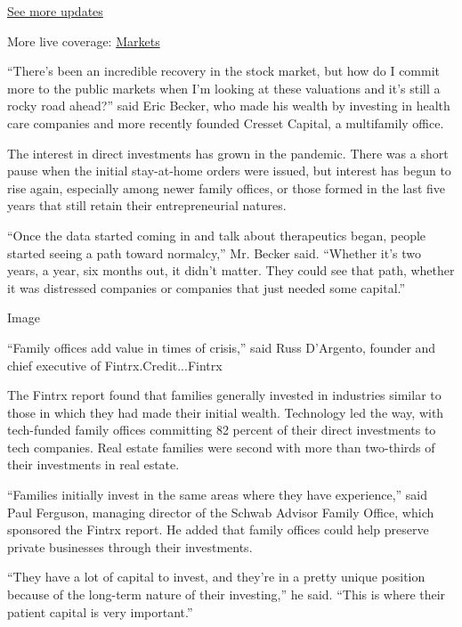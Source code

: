 \href{https://www.nytimes3xbfgragh.onion/2020/08/20/world/coronavirus-covid.html?action=click\&pgtype=Article\&state=default\&region=MAIN_CONTENT_1\&context=storylines_live_updates}{See
more updates}

More live coverage:
\href{https://www.nytimes3xbfgragh.onion/live/2020/08/20/business/stock-market-today-coronavirus?action=click\&pgtype=Article\&state=default\&region=MAIN_CONTENT_1\&context=storylines_live_updates}{Markets}

``There's been an incredible recovery in the stock market, but how do I
commit more to the public markets when I'm looking at these valuations
and it's still a rocky road ahead?'' said Eric Becker, who made his
wealth by investing in health care companies and more recently founded
Cresset Capital, a multifamily office.

The interest in direct investments has grown in the pandemic. There was
a short pause when the initial stay-at-home orders were issued, but
interest has begun to rise again, especially among newer family offices,
or those formed in the last five years that still retain their
entrepreneurial natures.

``Once the data started coming in and talk about therapeutics began,
people started seeing a path toward normalcy,'' Mr. Becker said.
``Whether it's two years, a year, six months out, it didn't matter. They
could see that path, whether it was distressed companies or companies
that just needed some capital.''

Image

``Family offices add value in times of crisis,'' said Russ D'Argento,
founder and chief executive of Fintrx.Credit...Fintrx

The Fintrx report found that families generally invested in industries
similar to those in which they had made their initial wealth. Technology
led the way, with tech-funded family offices committing 82 percent of
their direct investments to tech companies. Real estate families were
second with more than two-thirds of their investments in real estate.

``Families initially invest in the same areas where they have
experience,'' said Paul Ferguson, managing director of the Schwab
Advisor Family Office, which sponsored the Fintrx report. He added that
family offices could help preserve private businesses through their
investments.

``They have a lot of capital to invest, and they're in a pretty unique
position because of the long-term nature of their investing,'' he said.
``This is where their patient capital is very important.''

